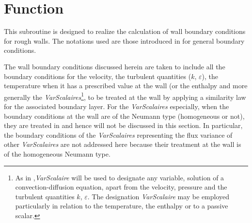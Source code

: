 
%
%
%
%



\hypertarget{clptrg}{}

\vspace{1cm}
\section*{Function}
This subroutine is designed to realize the calculation of wall boundary conditions
for rough walls. The notations used are those introduced in  for general boundary
conditions.

The wall boundary conditions discussed herein are taken to include all the boundary conditions
for the velocity, the turbulent quantities ($k$, $\varepsilon$), the temperature when it has
a prescribed value at the wall (or the enthalpy and more generally
the {\it VarScalaires}\footnote{As in ,{\it VarScalaire} will be used to designate
any variable, solution of a convection-diffusion equation, apart from the velocity, pressure and
the turbulent quantities $k$, $\varepsilon$.  The designation {\it VarScalaire} may be employed
particularly in relation to the temperature, the enthalpy or to a passive scalar.},
to be treated at the wall by applying a similarity law for the associated boundary layer.
For the {\it VarScalaires} especially, when the boundary conditions at the wall are
of the Neumann type (homogeneous or not), they are treated in  and hence will
not be discussed in this section. In particular, the boundary conditions of the  {\it VarScalaires}
representing the flux variance of other {\it VarScalaires} are not addressed here because
their treatment at the wall is of the homogeneous Neumann type.

